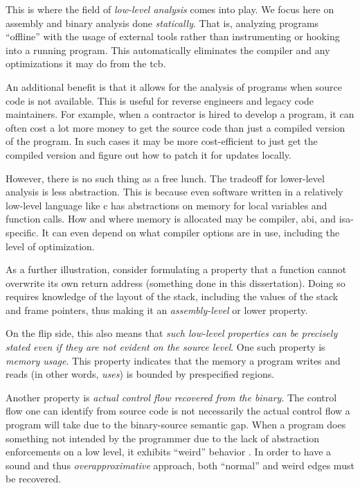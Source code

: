 This is where the field of \emph{low-level analysis} comes into play.
We focus here on assembly and binary analysis done \emph{statically}.
That is, analyzing programs ``offline'' with the usage of external tools rather than instrumenting or hooking into a running program.
This automatically eliminates the compiler and any optimizations it may do from the \ac{tcb}.

An additional benefit is that it allows for the analysis of programs when source code is not available.
This is useful for reverse engineers and legacy code maintainers.
For example, when a contractor is hired to develop a program, it can often cost a lot more money to get the source code than just a compiled version of the program.
In such cases it may be more cost-efficient to just get the compiled version and figure out how to patch it for updates locally.

However, there is no such thing as a free lunch.
The tradeoff for lower-level analysis is less abstraction.
This is because even software written in a relatively low-level language like \gls{c} has abstractions on memory for local variables and function calls.
How and where memory is allocated may be compiler, \ac{abi}, and \ac{isa}-specific.
It can even depend on what compiler options are in use, including the level of optimization.
\begin{example}\label{ex:rop}
  As a further illustration, consider formulating a property that a function cannot overwrite its own return address (something done in this dissertation).
  Doing so requires knowledge of the layout of the stack, including the values of the stack and frame pointers, thus making it an \emph{assembly-level} or lower property.
\end{example}
On the flip side, this also means that \emph{such low-level properties can be precisely stated even if they are not evident on the source level}.
One such property is \emph{memory usage}.
This property indicates that the memory a program writes and reads (in other words, \emph{uses}) is bounded by prespecified regions.

Another property is \emph{actual control flow recovered from the binary}.
The control flow one can identify from source code is not necessarily the actual control flow a program will take due to the binary-source semantic gap.
When a program does something not intended by the programmer due to the lack of abstraction enforcements on a low level, it exhibits ``weird'' behavior \autocite{shapiro2013weird,dullien2017weird}.
In order to have a sound and thus \emph{overapproximative} approach, both ``normal'' and weird edges must be recovered.

